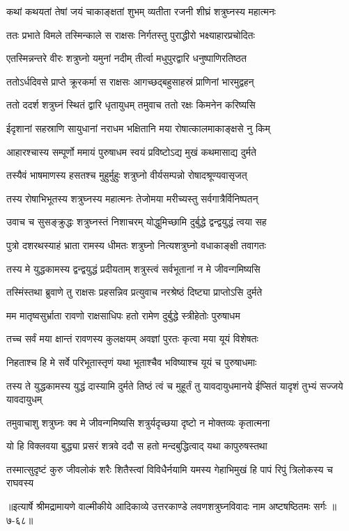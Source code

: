 
\twolineshloka
{कथां कथयतां तेषां जयं चाकाङ्क्षतां शुभम्}
{व्यतीता रजनी शीघ्रं शत्रुघ्नस्य महात्मनः} %

\twolineshloka
{ततः प्रभाते विमले तस्मिन्काले स राक्षसः}
{निर्गतस्तु पुराद्धीरो भक्ष्याहारप्रचोदितः} %

\twolineshloka
{एतस्मिन्नन्तरे वीरः शत्रुघ्नो यमुनां नदीम्}
{तीर्त्वा मधुपुरद्वारि धनुष्पाणिरतिष्ठत} %

\twolineshloka
{ततोऽर्धदिवसे प्राप्ते क्रूरकर्मा स राक्षसः}
{आगच्छद्बहुसाहस्रं प्राणिनां भारमुद्वहन्} %

\twolineshloka
{ततो ददर्श शत्रुघ्नं स्थितं द्वारि धृतायुधम्}
{तमुवाच ततो रक्षः किमनेन करिष्यसि} %

\twolineshloka
{ईदृशानां सहस्राणि सायुधानां नराधम}
{भक्षितानि मया रोषात्कालमाकाङ्क्षसे नु किम्} %

\twolineshloka
{आहारश्चास्य सम्पूर्णो ममायं पुरुषाधम}
{स्वयं प्रविष्टोऽद्य मुखं कथमासाद्य दुर्मते} %

\twolineshloka
{तस्यैवं भाषमाणस्य हसतश्च मुहुर्मुहुः}
{शत्रुघ्नो वीर्यसम्पन्नो रोषादश्रूण्यवासृजत्} %

\twolineshloka
{तस्य रोषाभिभूतस्य शत्रुघ्नस्य महात्मनः}
{तेजोमया मरीच्यस्तु सर्वगात्रैर्विनिष्पतन्} %

\twolineshloka
{उवाच च सुसङ्क्रुद्धः शत्रुघ्नस्तं निशाचरम्}
{योद्धुमिच्छामि दुर्बुद्धे द्वन्द्वयुद्धं त्वया सह} %

\twolineshloka
{पुत्रो दशरथस्याहं भ्राता रामस्य धीमतः}
{शत्रुघ्नो नित्यशत्रुघ्नो वधाकाङ्क्षी तवागतः} %

\twolineshloka
{तस्य मे युद्धकामस्य द्वन्द्वयुद्धं प्रदीयताम्}
{शत्रुस्त्वं सर्वभूतानां न मे जीवन्गमिष्यसि} %

\twolineshloka
{तस्मिंस्तथा ब्रुवाणे तु राक्षसः प्रहसन्निव}
{प्रत्युवाच नरश्रेष्ठं दिष्ट्या प्राप्तोऽसि दुर्मते} %

\twolineshloka
{मम मातृष्वसुर्भ्राता रावणो राक्षसाधिपः}
{हतो रामेण दुर्बुद्धे स्त्रीहेतोः पुरुषाधम} %

\twolineshloka
{तच्च सर्वं मया क्षान्तं रावणस्य कुलक्षयम्}
{अवज्ञां पुरतः कृत्वा मया यूयं विशेषतः} %

\twolineshloka
{निहताश्च हि मे सर्वे परिभूतास्तृणं यथा}
{भूताश्चैव भविष्याश्च यूयं च पुरुषाधमाः} %

\threelineshloka
{तस्य ते युद्धकामस्य युद्धं दास्यामि दुर्मते}
{तिष्ठं त्वं च मुहूर्तं तु यावदायुधमानये}
{ईप्सितं यादृशं तुभ्यं सज्जये यावदायुधम्} %

\twolineshloka
{तमुवाचाशु शत्रुघ्नः क्व मे जीवन्गमिष्यसि}
{शत्रुर्यदृच्छया दृष्टो न मोक्तव्यः कृतात्मना} %

\twolineshloka
{यो हि विक्लवया बुद्ध्या प्रसरं शत्रवे ददौ}
{स हतो मन्दबुद्धित्वाद् यथा कापुरुषस्तथा} %

\twolineshloka
{तस्मात्सुदृष्टं कुरु जीवलोकं शरैः शितैस्त्वां विविधैर्नयामि}
{यमस्य गेहाभिमुखं हि पापं रिपुं त्रिलोकस्य च राघवस्य} %


॥इत्यार्षे श्रीमद्रामायणे वाल्मीकीये आदिकाव्ये उत्तरकाण्डे लवणशत्रुघ्नविवादः नाम अष्टषष्ठितमः सर्गः ॥७-६८॥
